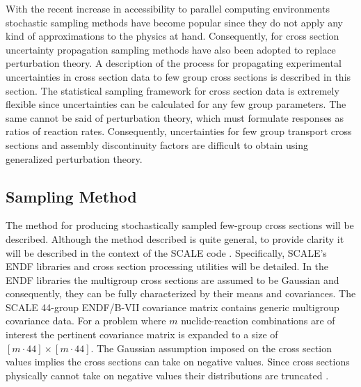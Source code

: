 With the recent increase in accessibility to parallel computing environments stochastic sampling methods have become popular since they do not apply any kind of approximations to the physics at hand. Consequently, for cross section uncertainty propagation sampling methods have also been adopted to replace perturbation theory. A description of the process for propagating experimental uncertainties in cross section data to few group cross sections is described in this section. The statistical sampling framework for cross section data is extremely flexible since uncertainties can be calculated for any few group parameters. The same cannot be said of perturbation theory, which must formulate responses as ratios of reaction rates. Consequently, uncertainties for few group transport cross sections and assembly discontinuity factors are difficult to obtain using generalized perturbation theory.   

\subsection{Sampling Method}
\label{subsec:xsec_sampling}

The method for producing stochastically sampled few-group cross sections will be described. Although the method described is quite general, to provide clarity it will be described in the context of the \ac{SCALE} code \cite{SCALE}. Specifically, \ac{SCALE}'s \ac{ENDF} libraries and cross section processing utilities will be detailed. In the \ac{ENDF} libraries the multigroup cross sections are assumed to be Gaussian and consequently, they can be fully characterized by their means and covariances. The \ac{SCALE} 44-group \ac{ENDF}/B-VII covariance matrix contains generic multigroup covariance data. For a problem where $m$ nuclide-reaction combinations are of interest the pertinent covariance matrix is expanded to a size of $\left[m\cdot 44\right]\times \left[m\cdot 44\right]$. The Gaussian assumption imposed on the cross section values implies the cross sections can take on negative values. Since cross sections physically cannot take on negative values their distributions are truncated \cite{Klein_Gallner}.      

